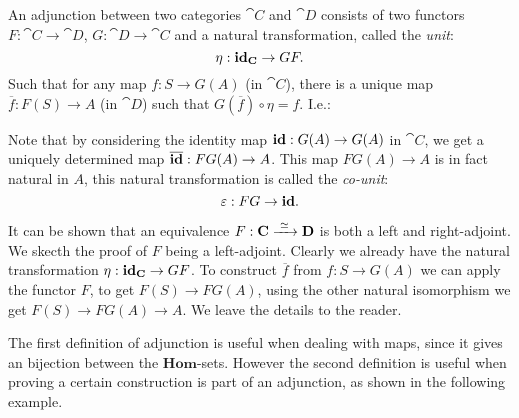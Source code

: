 \begin{definition}
	An adjunction between two categories $\cat{C}$ and $\cat{D}$ consists of two functors $F:\cat{C} \to \cat{D}$, $G: \cat{D} \to \cat{C}$ and a natural transformation, called the \emph{unit}:
	$$ \eta : \mathbf{id}_{\mathbf{C}} \to GF. $$
	Such that for any map $f: S \to G(A)$ (in $\cat{C}$), there is a unique map $\overline{f}: F(S) \to A$ (in $\cat{D}$) such that $G(\overline{f}) \circ \eta = f$. I.e.:
\begin{center}
\end{center}
\end{definition}

Note that by considering the identity map $\mathbf{id} : G(A) \to G(A)$ in $\cat{C}$, we get a uniquely determined map $\overline{\mathbf{id}}:FG(A) \to A$. This map $FG(A) \to A$ is in fact natural in $A$, this natural transformation is called the \emph{co-unit}:
$$ \varepsilon: FG \to \mathbf{id}. $$

It can be shown that an equivalence $F: \mathbf{C} \xrightarrow{\,\,{\simeq}\,\,} \mathbf{D}$ is both a left and right-adjoint. We skecth the proof of $F$ being a left-adjoint. Clearly we already have the natural transformation $\eta: \mathbf{id}_{\mathbf{C}} \to GF$. To construct $\overline{f}$ from $f: S \to G(A)$ we can apply the functor $F$, to get $F(S) \to FG(A)$, using the other natural isomorphism we get $F(S) \to FG(A) \to A$. We leave the details to the reader.

The first definition of adjunction is useful when dealing with maps, since it gives an bijection between the $\mathbf{Hom}$-sets. However the second definition is useful when proving a certain construction is part of an adjunction, as shown in the following example.

